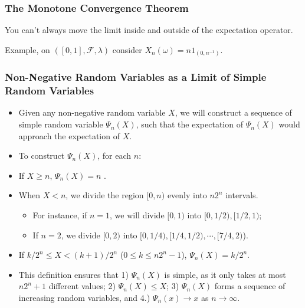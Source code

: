 \documentclass[handout]{beamer}
\begin{document}
\frame
{
  \frametitle{The Monotone Convergence Theorem}

You can't always move the limit inside and outside of the expectation operator.
\newline

Example, on $([0,1],\mathcal{F},\lambda)$ consider $X_n(\omega) = n 1_{(0,n^{-1})}$.
\newline

}


\frame
{
\frametitle{Non-Negative Random Variables as a Limit of Simple Random Variables}

\begin{itemize}

\item<1->[-] Given any non-negative random variable $X$, we will construct a sequence of simple random variable $\Psi_n(X)$, such that the expectation of  $\Psi_n(X)$ would approach the expectation of $X$.
                         
\item<2->[-]  To construct $\Psi_n(X)$, for each $n$:
                          
\item<2->[-]  If $X\geq n$, $\Psi_n(X)=n$ . 
                         
\item<3->[-]  When $X<n$, we divide the region $[0,n)$ evenly into $n 2^n$ intervals.
\begin{itemize}
\item For instance, if $n=1$, we will divide $[0,1)$ into $[0,1/2), [1/2,1)$; 
\item If $n=2$, we divide $[0,2)$ into $[0,1/4), [1/4, 1/2),\cdots, [7/4, 2)$). 
\end{itemize}
                         
\item<4->[-]  If $k/2^n\leq X< (k+1)/2^n$ ($0\leq k\leq n2^n-1$),  $\Psi_n(X)=k/2^n$.                    
                                
\item<5-> This definition ensures that 1) $\Psi_n(X)$ is simple, as it only takes at most $n2^n+1$ different values; 2) $\Psi_n(X)\leq X$; 3) $\Psi_n(X)$ forms a sequence of increasing random variables, and 4.) $\Psi_n(x)\rightarrow x$ as $n\rightarrow \infty$. 
                                                                                                                                 \end{itemize}
}
\end{document}
